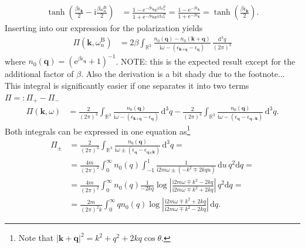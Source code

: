 \documentclass[english, parskip=full]{scrartcl}
\newcommand{\intx}{}
\newcommand{\intr}{}
\newcommand{\kla}{}
\newcommand{\tecxt}{}
\renewcommand{\i}{\text{i}}
\newcommand{\e}{\text{e}}
\begin{document}
\begin{align}
\tanh\kla\left( \frac{\beta \epsilon_\textbf{k}}{2} - \i\frac{\beta\omega_n^\tecxt\text{B}}{2} \right) &= \frac{1 - \e^{-\beta\epsilon_\textbf{k}} \e^{\i\beta\omega_n^\tecxt\text{B}}}{1 + \e^{-\beta\epsilon_\textbf{k}} \e^{\i\beta\omega_n^\tecxt\text{B}}} = \frac{1 - \e^{-\beta\epsilon_\textbf{k}}}{1 + \e^{-\beta\epsilon_\textbf{k}}} = \tanh\kla\left( \frac{\beta\epsilon_\textbf{k}}{2} \right).
\end{align}
Inserting into our expression for the polarization yields
\begin{align}
\Pi(\textbf{k}, \omega_n^\tecxt\text{B}) &= 2\beta\intr\int_{\mathbb{R}^{3}} \frac{n_0(\textbf{q}) - n_0(\textbf{k} + \textbf{q}) }{\i\omega - (\epsilon_{\textbf{k} + \textbf{q}} - \epsilon_\textbf{q}) } \, \frac{\mathrm{d}^{3}q}{(2\pi)^3}
\end{align}
where $n_0(\textbf{q}) = \kla\left( \e^{\beta\epsilon_\textbf{q}} + 1 \right)^{-1}$.
NOTE: this is the expected result except for the additional factor of $\beta$. Also the derivation is a bit shady due to the footnote...\\
This integral is significantly easier if one separates it into two terms $\Pi =: \Pi_+ - \Pi_-$
\begin{align}
\Pi(\textbf{k}, \omega) &= \frac{2}{(2\pi)^3} \intr\int_{\mathbb{R}^{3}} \frac{n_0(\textbf{q})}{\i\omega - (\epsilon_{\textbf{k} + \textbf{q}} - \epsilon_\textbf{q})} \, \mathrm{d}^{3}q - \frac{2}{(2\pi)^3} \intr\int_{\mathbb{R}^{3}} \frac{n_0(\textbf{q})}{\i\omega - (\epsilon_\textbf{q} - \epsilon_{\textbf{q} - \textbf{k}}) } \, \mathrm{d}^{3}q.
\end{align}
Both integrals can be expressed in one equation as\footnote{Note that $|\textbf{k} + \textbf{q}|^2 = k^2 + q^2 + 2kq \cos\theta$.}
\begin{align}
\Pi_\pm &= \frac{2}{(2\pi)^3} \intr\int_{\mathbb{R}^{3}} \frac{n_0(\textbf{q}) }{\i\omega \pm (\epsilon_\textbf{q} - \epsilon_{\textbf{q} \pm \textbf{k}})}  \, \mathrm{d}^{3}q  = \\
&= \frac{4m}{(2\pi)^2} \intx\int_{0}^{\infty} n_0(q) \int_{-1}^{1} \frac{1}{\i 2m\omega \pm (-k^2 \mp 2kqu)}  \, \mathrm{d}u \, q^2\mathrm{d}q = \\
&= \frac{4m}{(2\pi)^2} \intx\int_{0}^{\infty} n_0(q) \frac{1}{-2kq} \log\left\vert \frac{\i 2m\omega \mp k^2 - 2kq}{\i 2m\omega \mp k^2 + 2kq} \right\vert  \, q^2\mathrm{d}q = \\
&= \frac{2m}{(2\pi)^2k} \intx\int_{0}^{\infty} qn_0(q) \log \left\vert \frac{\i 2m\omega \mp k^2 + 2kq}{\i 2m\omega \mp k^2 - 2kq} \right\vert \, \mathrm{d}q.
\end{align}
\end{document}
